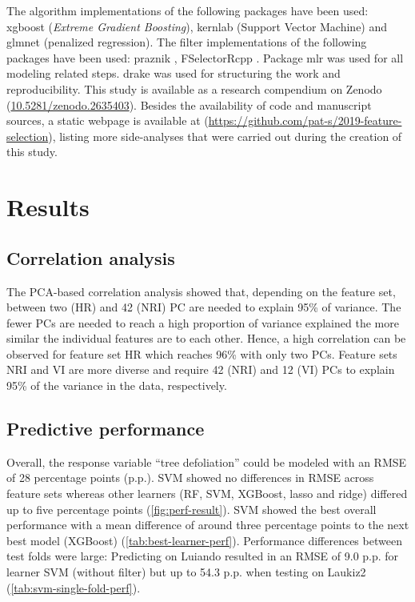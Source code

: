 \documentclass[journal]{IEEEtran}
\begin{document}
The algorithm implementations of the following packages have been used: xgboost \cite{chen2016} (\textit{Extreme Gradient Boosting}), kernlab \cite{kernlab} (Support Vector Machine) and glmnet \cite{glmnet} (penalized regression).
The filter implementations of the following packages have been used: praznik \cite{praznik}, FSelectorRcpp \cite{fselectorrcpp}.
Package mlr \cite{mlr} was used for all modeling related steps.
drake \cite{drake} was used for structuring the work and reproducibility.
This study is available as a research compendium on Zenodo (\url{10.5281/zenodo.2635403}).
Besides the availability of code and manuscript sources, a static webpage is available at (\url{https://github.com/pat-s/2019-feature-selection}), listing more side-analyses that were carried out during the creation of this study.

\section{Results}

\subsection{Correlation analysis}

The PCA-based correlation analysis showed that, depending on the feature set, between two (HR) and 42 (NRI) \ac{PC} are needed to explain 95\% of variance.
The fewer PCs are needed to reach a high proportion of variance explained the more similar the individual features are to each other.
Hence, a high correlation can be observed for feature set HR which reaches 96\% with only two PCs.
Feature sets NRI and VI are more diverse and require 42 (NRI) and 12 (VI) PCs to explain 95\% of the variance in the data, respectively.

\subsection{Predictive performance}

Overall, the response variable \enquote{tree defoliation} could be modeled with an \ac{RMSE} of 28 percentage points (p.p.).
SVM showed no differences in RMSE across feature sets whereas other learners (RF, SVM, XGBoost, lasso and ridge) differed up to five percentage points (\autoref{fig:perf-result}).
SVM showed the best overall performance with a mean difference of around three percentage points to the next best model (XGBoost) (\autoref{tab:best-learner-perf}).
Performance differences between test folds were large: Predicting on Luiando resulted in an RMSE of 9.0 p.p. for learner SVM (without filter) but up to 54.3 p.p. when testing on Laukiz2 (\autoref{tab:svm-single-fold-perf}).
\end{document}
